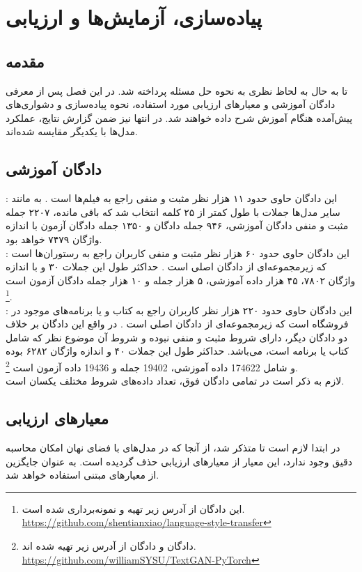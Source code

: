 \chapter{پیاده‌سازی، آزمایش‌ها و ارزیابی}\label{chap4}
\minitoc
\section{مقدمه}
تا به حال به لحاظ نظری به نحوه حل مسئله پرداخته شد. در این فصل پس از معرفی دادگان آموزشی و معیارهای ارزیابی مورد استفاده، نحوه پیاده‌سازی و دشواری‌های پیش‌آمده هنگام آموزش شرح داده خواهند شد. در انتها نیز ضمن گزارش نتایج، عملکرد مدل‌ها با یکدیگر مقایسه شده‌اند.
\section{دادگان آموزشی} \label{chap4:dataset}
:
این دادگان حاوی حدود ۱۱ هزار نظر مثبت و منفی راجع به فیلم‌ها است \cite{sst}. به مانند سایر مدل‌ها جملات با طول کمتر از ۲۵ کلمه انتخاب شد که باقی مانده، ۲۲۰۷ جمله مثبت و منفی دادگان آموزشی، ۹۴۶ جمله دادگان \validation{} و ۱۳۵۰ جمله دادگان آزمون با اندازه واژگان ۷۴۷۹ خواهد بود.
\\
:
این دادگان حاوی حدود ۶۰ هزار نظر مثبت و منفی کاربران راجع به رستوران‌ها است که زیرمجموعه‌ای از دادگان اصلی است
.
حداکثر طول این جملات ۳۰ و با اندازه واژگان ۷۸۰۲، ۴۵ هزار داده آموزشی، ۵ هزار جمله \validation{} و ۱۰ هزار جمله دادگان آزمون است
\footnote{
    این دادگان از آدرس زیر تهیه و نمونه‌برداری شده است.
    \\
   \url{https://github.com/shentianxiao/language-style-transfer}}.
\\
:
این دادگان حاوی حدود ۲۲۰ هزار نظر کاربران راجع به کتاب و یا برنامه‌های موجود در فروشگاه  است که زیرمجموعه‌ای از دادگان اصلی است \cite{amazon_review}. در واقع این دادگان بر خلاف دو دادگان دیگر، دارای شروط مثبت و منفی نبوده و شروط آن موضوع نظر که شامل کتاب یا برنامه است، می‌باشد. حداکثر طول این جملات ۴۰ و اندازه واژگان ۶۲۸۲ بوده و شامل 174622 داده آموزشی، 19402 جمله \validation{} و 19436 داده آزمون است
\footnote{
دادگان \amazon{} و دادگان \sst{} از آدرس زیر تهیه شده اند.
\\
    \url{https://github.com/williamSYSU/TextGAN-PyTorch}}.
\\
لازم به ذکر است در تمامی دادگان فوق، تعداد داده‌های شروط مختلف یکسان است.
\section{معیارهای ارزیابی} \label{chap4:metrics}
در ابتدا لازم است تا متذکر شد، از آنجا که در مدل‌های با فضای نهان امکان محاسبه دقیق \likelihood{} وجود ندارد، این معیار از معیارهای ارزیابی حذف گردیده است. به عنوان جایگزین از معیار‌های مبتنی \ngramphrase{} استفاده خواهد شد.
